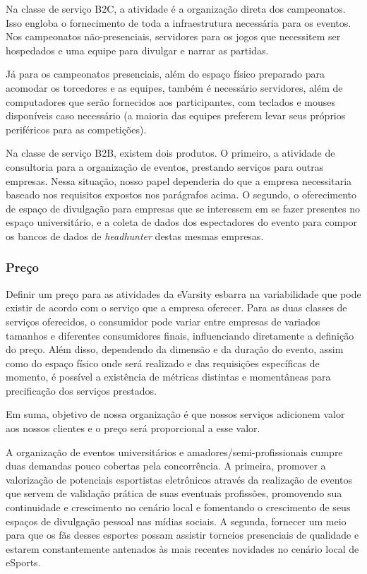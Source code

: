 \documentclass[a4paper, 12pt]{paper}
\begin{document}
Na classe de serviço B2C, a atividade é a organização direta dos campeonatos. Isso engloba o fornecimento de toda a infraestrutura necessária para os eventos. Nos campeonatos não-presenciais, servidores para os jogos que necessitem ser hospedados e uma equipe para divulgar e narrar as partidas.

Já para os campeonatos presenciais, além do espaço físico preparado para acomodar os torcedores e as equipes, também é necessário servidores, além de computadores que serão fornecidos aos participantes, com teclados e mouses disponíveis caso necessário (a maioria das equipes preferem levar seus próprios periféricos para as competições).

Na classe de serviço B2B, existem dois produtos. O primeiro, a atividade de consultoria para a organização de eventos, prestando serviços para outras empresas. Nessa situação, nosso papel dependeria do que a empresa necessitaria baseado nos requisitos expostos nos parágrafos acima. O segundo, o oferecimento de espaço de divulgação para empresas que se interessem em se fazer presentes no espaço universitário, e a coleta de dados dos espectadores do evento para compor os bancos de dados de \textit{headhunter} destas mesmas empresas.
\subsubsection{Preço}
Definir um preço para as atividades da eVarsity esbarra na variabilidade que pode existir de acordo com o serviço que a empresa oferecer. Para as duas classes de serviços oferecidos, o consumidor pode variar entre empresas de variados tamanhos e diferentes consumidores finais, influenciando diretamente a definição do preço. Além disso, dependendo da dimensão e da duração do evento, assim como do espaço físico onde será realizado e das requisições específicas de momento, é possível a existência de métricas distintas e momentâneas para precificação dos serviços prestados.

Em suma, objetivo de nossa organização é que nossos serviços adicionem valor aos nossos clientes e o preço será proporcional a esse valor.

A organização de eventos universitários e amadores/semi-profissionais cumpre duas demandas pouco cobertas pela concorrência. A primeira, promover a valorização de potenciais esportistas eletrônicos através da realização de eventos que servem de validação prática de suas eventuais profissões, promovendo sua continuidade e crescimento no cenário local e fomentando o crescimento de seus espaços de divulgação pessoal nas mídias sociais. A segunda, fornecer um meio para que os fãs desses esportes possam assistir torneios presenciais de qualidade e estarem constantemente antenados às mais recentes novidades no cenário local de eSports. 
\end{document}
